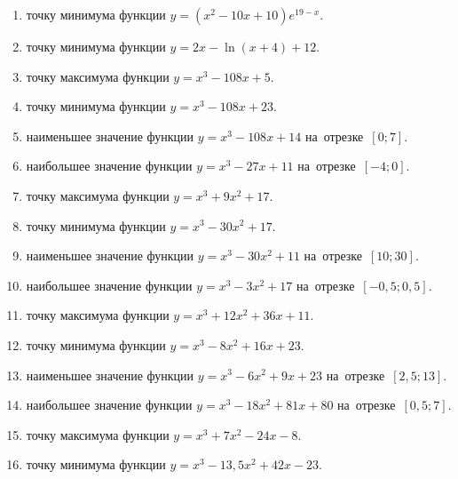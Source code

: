 \documentclass[a4paper,10pt]{article}
\begin{document}
\begin{enumerate}
\item {} точку минимума функции $y=\left(x^2-10x+10\right){{e}^{19-x}}$.

\item {} точку минимума функции $y=2x-\ln \left(x+4\right)+12$.

\item {} точку максимума функции $y=x^3 -108x +5$.

\item {} точку минимума функции $y=x^3 -108x+23$.

\item {} наименьшее значение функции $y=x^3 -108x+14$ на~отрезке~$\left[0;7\right]$.

\item {} наибольшее значение функции $y=x^3 -27x+11$ на~отрезке~$\left[-4;0\right]$.

\item {} точку максимума функции $y=x^3 +9x^2+17$.

\item {} точку минимума функции $y=x^3 -30x^2+17$.

\item {} наименьшее значение функции $y=x^3 -30x^2+11$ на~отрезке~$\left[10;30\right]$.

\item {} наибольшее значение функции $y=x^3 -3x^2+17$ на~отрезке~$\left[-0,5;0,5\right]$.

\item {} точку максимума функции $y=x^3 +12x^2+36x+11$.

\item {} точку минимума функции $y=x^3 -8x^2+16x+23$.

\item {} наименьшее значение функции $y=x^3 -6x^2+9x+23$ на~отрезке~$\left[2,5;13\right]$.

\item {} наибольшее значение функции $y=x^3 -18x^2+81x+80$ на~отрезке~$\left[0,5;7\right]$.

\item {} точку максимума функции $y=x^3 +7x^2-24x-8$.

\item {} точку минимума функции $y=x^3 -13,5x^2+42x-23$.


\end{enumerate}
\end{document}
